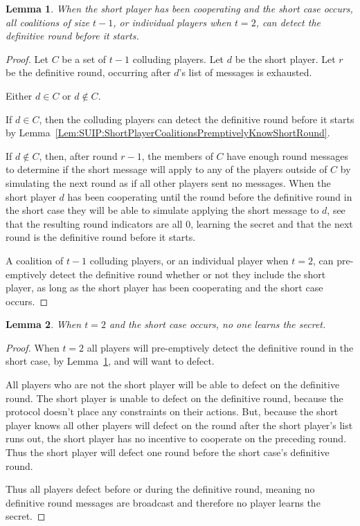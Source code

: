 \documentclass[12pt]{dalcsthesis}
\newtheorem{lemma}{Lemma}
\begin{document}
\begin{lemma}\label{Lem:SUIP:MaxSizeCoalitionsPremptivelyKnowShortRound}When the short player has been cooperating and the short case occurs, all coalitions of size $t-1$, or individual players when $t = 2$, can detect the definitive round before it starts.\end{lemma}
\begin{proof}
Let $C$ be a set of $t-1$ colluding players. Let $d$ be the short player. Let $r$ be the definitive round, occurring after $d$'s list of messages is exhausted.

Either $d \in C$ or $d \notin C$.

If $d \in C$, then the colluding players can detect the definitive round before it starts by Lemma~\ref{Lem:SUIP:ShortPlayerCoalitionsPremptivelyKnowShortRound}.

If $d \notin C$, then, after round $r-1$, the members of $C$ have enough round messages to determine if the short message will apply to any of the players outside of $C$ by simulating the next round as if all other players sent no messages. When the short player $d$ has been cooperating until the round before the definitive round in the short case they will be able to simulate applying the short message to $d$, see that the resulting round indicators are all $0$, learning the secret and that the next round is the definitive round before it starts.

A coalition of $t-1$ colluding players, or an individual player when $t=2$, can pre-emptively detect the definitive round whether or not they include the short player, as long as the short player has been cooperating and the short case occurs.
\end{proof}
 
\begin{lemma}\label{Lem:SUIP:MinimumThresholdAndShortCaseMeansNoOneLearnsSecret}When $t=2$ and the short case occurs, no one learns the secret.\end{lemma}
\begin{proof}
When $t=2$ all players will pre-emptively detect the definitive round in the short case, by Lemma~\ref{Lem:SUIP:MaxSizeCoalitionsPremptivelyKnowShortRound}, and will want to defect.

All players who are not the short player will be able to defect on the definitive round. The short player is unable to defect on the definitive round, because the protocol doesn't place any constraints on their actions. But, because the short player knows all other players will defect on the round after the short player's list runs out, the short player has no incentive to cooperate on the preceding round. Thus the short player will defect one round before the short case's definitive round.

Thus all players defect before or during the definitive round, meaning no definitive round messages are broadcast and therefore no player learns the secret.
\end{proof}
\end{document}
